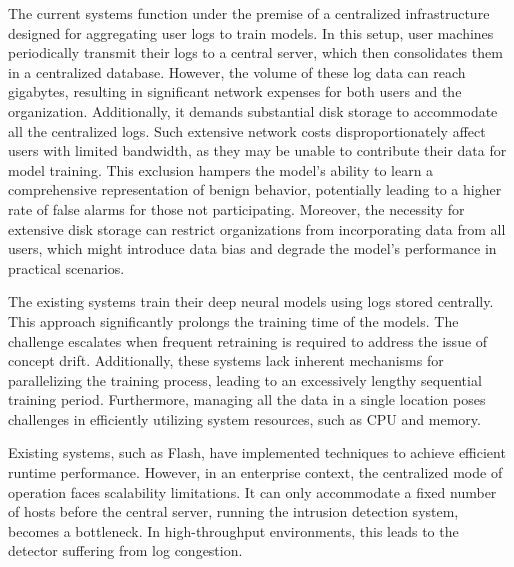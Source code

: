  The current systems function under the premise of a centralized infrastructure designed for aggregating user logs to train models. In this setup, user machines periodically transmit their logs to a central server, which then consolidates them in a centralized database. However, the volume of these log data can reach gigabytes, resulting in significant network expenses for both users and the organization. Additionally, it demands substantial disk storage to accommodate all the centralized logs. Such extensive network costs disproportionately affect users with limited bandwidth, as they may be unable to contribute their data for model training. This exclusion hampers the model's ability to learn a comprehensive representation of benign behavior, potentially leading to a higher rate of false alarms for those not participating. Moreover, the necessity for extensive disk storage can restrict organizations from incorporating data from all users, which might introduce data bias and degrade the model's performance in practical scenarios.

 The existing systems train their deep neural models using logs stored centrally. This approach significantly prolongs the training time of the models. The challenge escalates when frequent retraining is required to address the issue of concept drift. Additionally, these systems lack inherent mechanisms for parallelizing the training process, leading to an excessively lengthy sequential training period. Furthermore, managing all the data in a single location poses challenges in efficiently utilizing system resources, such as CPU and memory.

 Existing systems, such as Flash, have implemented techniques to achieve efficient runtime performance. However, in an enterprise context, the centralized mode of operation faces scalability limitations. It can only accommodate a fixed number of hosts before the central server, running the intrusion detection system, becomes a bottleneck. In high-throughput environments, this leads to the detector suffering from log congestion.
